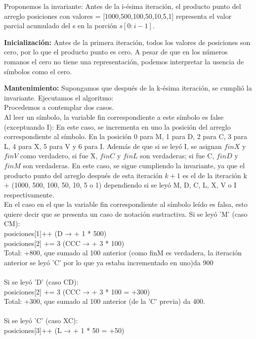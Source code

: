 \documentclass[12pt]{article}
\begin{document}
\begin{itemize}
    Proponemos la invariante: Antes de la i-ésima iteración, el producto punto del arreglo posiciones con valores = [1000,500,100,50,10,5,1] representa el valor parcial acumulado del s en la porción $s[0:i - 1]$.

    \textbf{Inicialización:} Antes de la primera iteración, todos los valores de posiciones son cero, por lo que el producto punto es cero. A pesar de que en los números romanos el cero no tiene una representación, podemos interpretar la usencia de símbolos como el cero.

    \textbf{Mantenimiento:} Supongamos que después de la k-ésima iteración, se cumplió la invariante.
    Ejecutamos el algoritmo:\\
    Procedemos a contemplar dos casos.\\
    Al leer un símbolo, la variable fin correspondiente a este símbolo es false (exceptuando I):
    En este caso, se incrementa en uno la posición del arreglo correspondiente al símbolo. En la posición 0 para M, 1 para D, 2 para C, 3 para L, 4 para X, 5 para V y 6 para I.
    Además de que si se leyó I, se asignan $finX$ y $finV$ como verdadero, si fue X, $finC$ y $finL$ son verdaderas; si fue C, $finD$ y $finM$ son verdaderas.
    En este caso, se sigue cumpliendo la invariante, ya que el producto punto del arreglo después de esta iteración $k + 1$ es el de la iteración k + (1000, 500, 100, 50, 10, 5 o 1) dependiendo si se leyó M, D, C, L, X, V o I respectivamente.\\
    En el caso en el que la variable fin correspondiente al símbolo leído es falsa, esto quiere decir que se presenta un caso de notación sustractiva.
    Si se leyó 'M' (caso CM):\\
    posiciones[1]++ (D → + 1 * 500)\\
    posiciones[2] += 3 (CCC → + 3 * 100)\\
    Total: +800, que sumado al 100 anterior (como finM es verdadera, la iteración anterior se leyó 'C' por lo que ya estaba incrementado en uno)da 900\\\\
    Si se leyó 'D' (caso CD):\\
    posiciones[2] += 3 (CCC → + 3 * 100 = +300)\\
    Total: +300, que sumado al 100 anterior (de la 'C' previa) da 400.\\\\
    Si se leyó 'C' (caso XC):\\
    posiciones[3]++ (L → + 1 * 50 = +50)\\

\end{itemize}
\end{document}
